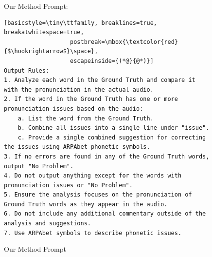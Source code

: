 \documentclass[11pt]{article}
\begin{document}
\begin{figure}[ht]
\begin{AIBox}{Our Method Prompt:}
\begin{minipage}[t]{\textwidth}
\begin{lstlisting}[basicstyle=\tiny\ttfamily, breaklines=true, breakatwhitespace=true,
                   postbreak=\mbox{\textcolor{red}{$\hookrightarrow$}\space},
                   escapeinside={(*@}{@*)}]
Output Rules:
1. Analyze each word in the Ground Truth and compare it with the pronunciation in the actual audio.
2. If the word in the Ground Truth has one or more pronunciation issues based on the audio:
    a. List the word from the Ground Truth.
    b. Combine all issues into a single line under "issue".
    c. Provide a single combined suggestion for correcting the issues using ARPAbet phonetic symbols.
3. If no errors are found in any of the Ground Truth words, output "No Problem". 
4. Do not output anything except for the words with pronunciation issues or "No Problem". 
5. Ensure the analysis focuses on the pronunciation of Ground Truth words as they appear in the audio.
6. Do not include any additional commentary outside of the analysis and suggestions.
7. Use ARPAbet symbols to describe phonetic issues.
\end{lstlisting}
\end{minipage}

\end{AIBox}
\caption{Our Method Prompt}
\label{fig:our_prompt}
\end{figure}
\end{document}
